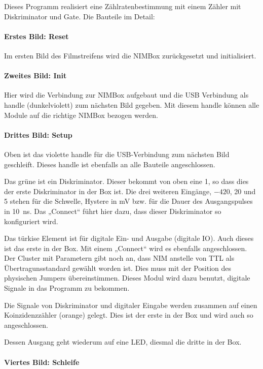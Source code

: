 \documentclass[11pt, ngerman, fleqn, DIV=15, headinclude, BCOR=2cm]{scrreprt}
\begin{document}
Dieses Programm realisiert eine Zählratenbestimmung mit einem Zähler mit
Diskriminator und Gate. Die Bauteile im Detail:

\paragraph{Erstes Bild: Reset}

Im ersten Bild des Filmstreifens wird die NIMBox zurückgesetzt und
initialisiert.

\paragraph{Zweites Bild: Init}

Hier wird die Verbindung zur NIMBox aufgebaut und die USB Verbindung als handle
(dunkelviolett) zum nächsten Bild gegeben. Mit diesem handle können alle Module
auf die richtige NIMBox bezogen werden.

\paragraph{Drittes Bild: Setup}

Oben ist das violette handle für die USB-Verbindung zum nächsten Bild
geschleift. Dieses handle ist ebenfalls an alle Bauteile angeschlossen.

Das grüne ist ein Diskriminator. Dieser bekommt von oben eine 1, so dass dies
der erste Diskriminator in der Box ist. Die drei weiteren Eingänge, $-420$, 20
und 5 stehen für die Schwelle, Hystere in \si{\milli\volt} bzw. für die Dauer
des Ausgangspulses in \SI{10}{\nano\second}. Das „Connect“ führt hier dazu,
dass dieser Diskriminator so konfiguriert wird.

Das türkise Element ist für digitale Ein- und Ausgabe (digitale IO). Auch
dieses ist das erste in der Box. Mit einem „Connect“ wird es ebenfalls
angeschlossen. Der Cluster mit Parametern gibt noch an, dass NIM anstelle von
TTL als Übertragunsstandard gewählt worden ist. Dies muss mit der Position des
physischen Jumpers übereinstimmen. Dieses Modul wird dazu benutzt, digitale
Signale in das Programm zu bekommen.

Die Signale von Diskriminator und digitaler Eingabe werden zusammen auf einen
Koinzidenzzähler (orange) gelegt. Dies ist der erste in der Box und wird auch
so angeschlossen.

Dessen Ausgang geht wiederum auf eine LED, diesmal die dritte in der Box.

\paragraph{Viertes Bild: Schleife}
\end{document}
